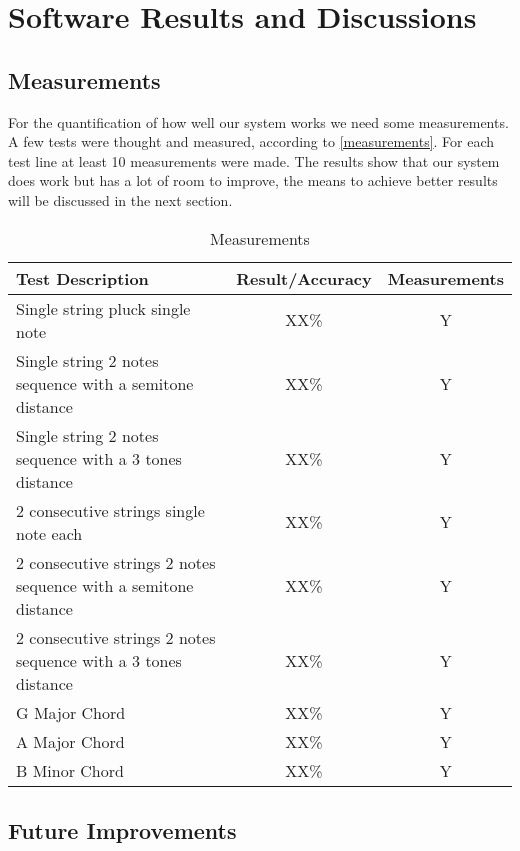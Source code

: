 \section{Software Results and Discussions}

\subsection{Measurements}
For the quantification of how well our system works we need some measurements.
A few tests were thought and measured, according to \autoref{measurements}.
For each test line at least 10 measurements were made. The results show that
our system does work but has a lot of room to improve, the means to achieve
better results will be discussed in the next section.

\begin{table}[htb]
  \begin{center}
    \ABNTEXreducedfont
    \caption[Measurements]{Measurements}
    \label{measurements}
    \begin{tabular}{p{10cm}|c|c}
      \hline
      Test Description & Result/Accuracy & Measurements\\
      \hline \hline
      Single string pluck single note & XX\% & Y\\ \hline
      Single string 2 notes sequence with a semitone distance & XX\% & Y \\ \hline
      Single string 2 notes sequence with a 3 tones distance & XX\% & Y \\ \hline
      2 consecutive strings single note each & XX\% & Y \\ \hline
      2 consecutive strings 2 notes sequence with a semitone distance & XX\% & Y \\ \hline
      2 consecutive strings 2 notes sequence with a 3 tones distance & XX\% & Y \\ \hline
      G Major Chord & XX\% & Y \\ \hline
      A Major Chord & XX\% & Y \\ \hline
      B Minor Chord & XX\% & Y \\ \hline
      \hline
    \end{tabular}
  \end{center}
\end{table}

\subsection{Future Improvements}
